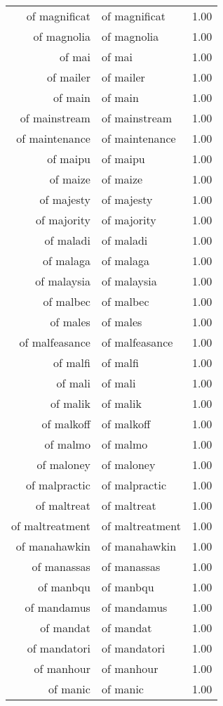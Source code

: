 \begin{table}[ht]
\begin{tabular}{rlr}
  of magnificat & of magnificat & 1.00 \\ 
  of magnolia & of magnolia & 1.00 \\ 
  of mai & of mai & 1.00 \\ 
  of mailer & of mailer & 1.00 \\ 
  of main & of main & 1.00 \\ 
  of mainstream & of mainstream & 1.00 \\ 
  of maintenance & of maintenance & 1.00 \\ 
  of maipu & of maipu & 1.00 \\ 
  of maize & of maize & 1.00 \\ 
  of majesty & of majesty & 1.00 \\ 
  of majority & of majority & 1.00 \\ 
  of maladi & of maladi & 1.00 \\ 
  of malaga & of malaga & 1.00 \\ 
  of malaysia & of malaysia & 1.00 \\ 
  of malbec & of malbec & 1.00 \\ 
  of males & of males & 1.00 \\ 
  of malfeasance & of malfeasance & 1.00 \\ 
  of malfi & of malfi & 1.00 \\ 
  of mali & of mali & 1.00 \\ 
  of malik & of malik & 1.00 \\ 
  of malkoff & of malkoff & 1.00 \\ 
  of malmo & of malmo & 1.00 \\ 
  of maloney & of maloney & 1.00 \\ 
  of malpractic & of malpractic & 1.00 \\ 
  of maltreat & of maltreat & 1.00 \\ 
  of maltreatment & of maltreatment & 1.00 \\ 
  of manahawkin & of manahawkin & 1.00 \\ 
  of manassas & of manassas & 1.00 \\ 
  of manbqu & of manbqu & 1.00 \\ 
  of mandamus & of mandamus & 1.00 \\ 
  of mandat & of mandat & 1.00 \\ 
  of mandatori & of mandatori & 1.00 \\ 
  of manhour & of manhour & 1.00 \\ 
  of manic & of manic & 1.00 \\ 

\end{tabular}
\end{table}
